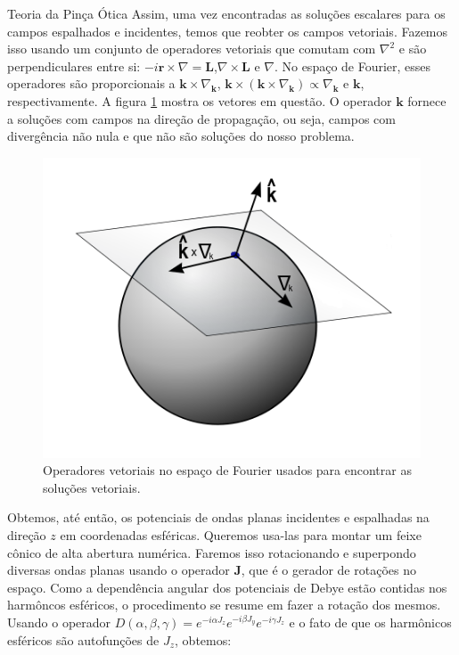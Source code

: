 \begin{chapter}{Teoria da Pinça Ótica}
Assim, uma vez encontradas as soluções escalares para os campos espalhados e incidentes, temos que reobter os campos vetoriais. Fazemos isso usando um conjunto de operadores vetoriais que comutam com $\nabla ^2$ e são perpendiculares entre si: $-i {\mathbf r}\times\nabla = {\mathbf L}$,$\nabla \times {\mathbf L}$ e $\nabla$. No espaço de Fourier, esses operadores são proporcionais a ${\mathbf k}\times \nabla_{\mathbf k}$, ${\mathbf k}\times({\mathbf k}\times \nabla_{\mathbf k}) \propto \nabla_{\mathbf k}$ e ${\mathbf k}$, respectivamente. A figura \ref{vet_fourier} mostra os vetores em questão. O operador ${\mathbf k}$ fornece a soluções com campos na direção de propagação, ou seja, campos com divergência não nula e que não são soluções do nosso problema.
%
\begin{figure}[h]
\begin{center}
\includegraphics[scale=0.5]{vec_fourier}
\caption{Operadores vetoriais no espaço de Fourier usados para encontrar as soluções vetoriais.}
\label{vet_fourier}
\end{center}
\end{figure}
%
Obtemos, até então, os potenciais de ondas planas incidentes e espalhadas na direção $z$ em coordenadas esféricas. Queremos usa-las para montar um feixe cônico de alta abertura numérica. Faremos isso rotacionando e superpondo diversas ondas planas usando o operador ${\mathbf J}$, que é o gerador de rotações no espaço. Como a dependência angular dos potenciais de Debye estão contidas nos harmôncos esféricos, o procedimento se resume em fazer a rotação dos mesmos. Usando o operador $D(\alpha,\beta,\gamma)=e^{-i\alpha J_z}e^{-i\beta J_y}e^{-i\gamma J_z}$ e o fato de que os harmônicos esféricos são autofunções de $J_z$, obtemos:


\end{chapter}
